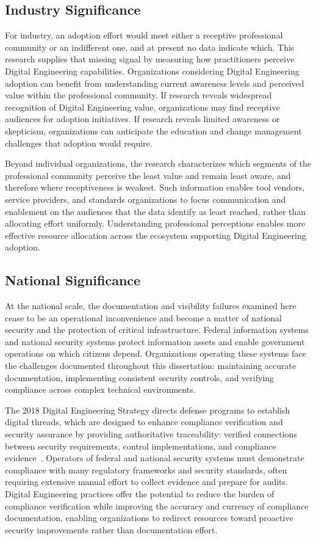\subsection{Industry Significance}

For industry, an adoption effort would meet either a receptive professional community or an indifferent one, and at present no data indicate which. This research supplies that missing signal by measuring how practitioners perceive Digital Engineering capabilities. Organizations considering Digital Engineering adoption can benefit from understanding current awareness levels and perceived value within the professional community. If research reveals widespread recognition of Digital Engineering value, organizations may find receptive audiences for adoption initiatives. If research reveals limited awareness or skepticism, organizations can anticipate the education and change management challenges that adoption would require.

Beyond individual organizations, the research characterizes which segments of the professional community perceive the least value and remain least aware, and therefore where receptiveness is weakest. Such information enables tool vendors, service providers, and standards organizations to focus communication and enablement on the audiences that the data identify as least reached, rather than allocating effort uniformly. Understanding professional perceptions enables more effective resource allocation across the ecosystem supporting Digital Engineering adoption.

\subsection{National Significance}

At the national scale, the documentation and visibility failures examined here cease to be an operational inconvenience and become a matter of national security and the protection of critical infrastructure. Federal information systems and national security systems protect information assets and enable government operations on which citizens depend. Organizations operating these systems face the challenges documented throughout this dissertation: maintaining accurate documentation, implementing consistent security controls, and verifying compliance across complex technical environments.

The 2018 Digital Engineering Strategy directs defense programs to establish digital threads, which are designed to enhance compliance verification and security assurance by providing authoritative traceability: verified connections between security requirements, control implementations, and compliance evidence~\parencite{DoD_DE_Strategy_2018}. Operators of federal and national security systems must demonstrate compliance with many regulatory frameworks and security standards, often requiring extensive manual effort to collect evidence and prepare for audits. Digital Engineering practices offer the potential to reduce the burden of compliance verification while improving the accuracy and currency of compliance documentation, enabling organizations to redirect resources toward proactive security improvements rather than documentation effort.


